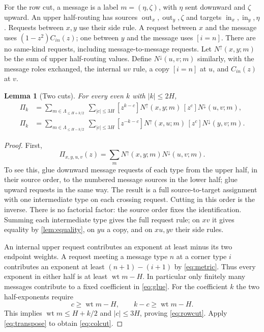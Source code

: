 \documentclass[11pt]{article}
\newtheorem{lemma}[theorem]{Lemma}
\theoremstyle{definition}
\theoremstyle{remark}
\newcommand{\wt}{\operatorname{wt}}
\newcommand{\out}{\operatorname{out}}
\newcommand{\inn}{\operatorname{in}}
\newcommand{\up}{N^{\uparrow}}
\newcommand{\down}{N^{\downarrow}}
\begin{document}
For the row cut, a message is a label $m=(\eta,\zeta)$, with $\eta$ sent downward and $\zeta$ upward. An upper half-routing has sources $\out_x,\out_y,\zeta$ and targets $\inn_x,\inn_y,\eta$. Requests between $x,y$ use their side rule. A request between $x$ and the message uses $(1-z^2)C_{in}(z)$; one between $y$ and the message uses $[i=n]$. There are no same-kind requests, including message-to-message requests. Let $\up(x,y;m)$ be the sum of upper half-routing values. Define $\down(u,v;m)$ similarly, with the message roles exchanged, the internal $uv$ rule, a copy $[i=n]$ at $u$, and $C_{in}(z)$ at $v$.

\begin{lemma}[Two cuts]\label{lem:cuts}
For every even $k$ with $|k|\le2H$,
\begin{align}
 \Pi_k&=\sum_{m\in\Lambda_{\le H+k/2}}\ \sum_{|c|\le3H}
 [z^{k-c}]\up(x,y;m)\,[z^c]\down(u,v;m),\label{eq:rowcut}\\
 \Pi_k&=\sum_{m\in\Lambda_{\le H-k/2}}\ \sum_{|c|\le3H}
 [z^{-k-c}]\up(x,u;m)\,[z^c]\down(y,v;m).\label{eq:colcut}
\end{align}
\end{lemma}

\begin{proof}
First,
\begin{equation}\label{eq:glue}
 \Pi_{x,y,u,v}(z)=\sum_m\up(x,y;m)\down(u,v;m).
\end{equation}
To see this, glue downward message requests of each type from the upper half, in their source order, to the numbered message sources in the lower half; glue upward requests in the same way. The result is a full source-to-target assignment with one intermediate type on each crossing request. Cutting in this order is the inverse. There is no factorial factor: the source order fixes the identification. Summing each intermediate type gives the full request rule; on $xv$ it gives equality by \cref{lem:equality}, on $yu$ a copy, and on $xu,yv$ their side rules.

An internal upper request contributes an exponent at least minus its two endpoint weights. A request meeting a message type $n$ at a corner type $i$ contributes an exponent at least $(n+1)-(i+1)$ by \eqref{eq:metric}. Thus every exponent in either half is at least $\wt m-H$. In particular only finitely many messages contribute to a fixed coefficient in \eqref{eq:glue}. For the coefficient $k$ the two half-exponents require
\[
 c\ge\wt m-H,\qquad k-c\ge\wt m-H.
\]
This implies $\wt m\le H+k/2$ and $|c|\le3H$, proving \eqref{eq:rowcut}. Apply \eqref{eq:transpose} to obtain \eqref{eq:colcut}.
\end{proof}
\end{document}
